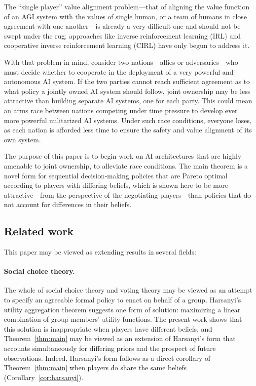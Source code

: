 \documentclass{article}
\newcommand{\thm}[1]{Theorem~\ref{thm:#1}}
\newcommand{\cor}[1]{Corollary~\ref{cor:#1}}
\begin{document}
The ``single player'' value alignment problem---that of aligning the value function of an AGI system with the values of single human, or a team of humans in close agreement with one another---is already a very difficult one and should not be swept under the rug; approaches like inverse reinforcement learning (IRL) \citep{russell1998learning} \citep{ng2000algorithms} \citep{abbeel2004apprenticeship} and cooperative inverse reinforcement learning (CIRL) \citep{hadfield2016cooperative} have only begun to address it.

With that problem in mind, consider two nations---allies or adversaries---who must decide whether to cooperate in the deployment of a very powerful and autonomous AI system.  If the two parties cannot reach sufficient agreement as to what policy a jointly owned AI system should follow, joint ownership may be less attractive than building separate AI systems, one for each party.  This could mean an arms race between nations competing under time pressure to develop ever more powerful militarized AI systems. Under such race conditions, everyone loses, as each nation is afforded less time to ensure the safety and value alignment of its own system. 

The purpose of this paper is to begin work on AI architectures that are highly amenable to joint ownership, to alleviate race conditions.  The main theorem is a novel form for sequential decision-making policies that are Pareto optimal according to players with differing beliefs, which is shown here to be more attractive---from the perspective of the negotiating players---than policies that do not account for differences in their beliefs.

\subsection{Related work}

This paper may be viewed as extending results in several fields:

\paragraph{Social choice theory.} The whole of social choice theory and voting theory may be viewed as an attempt to specify an agreeable formal policy to enact on behalf of a group.  Harsanyi's utility aggregation theorem \citep{harsanyi1980cardinal} suggests one form of solution: maximizing a linear combination of group members' utility functions.  The present work shows that this solution is inappropriate when players have different beliefs, and \thm{main} may be viewed as an extension of Harsanyi's form that accounts simultaneously for differing priors and the prospect of future observations.  Indeed, Harsanyi's form follows as a direct corollary of \thm{main} when players do share the same beliefs (\cor{harsanyi}).
\end{document}
